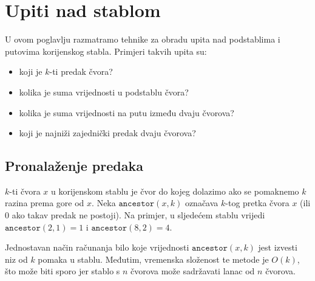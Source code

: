 \chapter{Upiti nad stablom}


U ovom poglavlju razmatramo tehnike za
obradu upita nad
podstablima i putovima korijenskog stabla.
Primjeri takvih upita su:

\begin{itemize}
\item koji je $k$-ti predak čvora?
\item kolika je suma vrijednosti u podstablu čvora?
\item kolika je suma vrijednosti na putu između dvaju čvorova?
\item koji je najniži zajednički predak dvaju čvorova?
\end{itemize}

\section{Pronalaženje predaka}


$k$-ti  čvora $x$ u korijenskom stablu
je čvor do kojeg dolazimo ako se pomaknemo $k$
razina prema gore od $x$.
Neka $\texttt{ancestor}(x,k)$ označava $k$-tog pretka čvora $x$
(ili $0$ ako takav predak ne postoji).
Na primjer, u sljedećem stablu vrijedi
$\texttt{ancestor}(2,1)=1$ i $\texttt{ancestor}(8,2)=4$.
\begin{center}
\end{center}

Jednostavan način računanja bilo koje vrijednosti $\texttt{ancestor}(x,k)$
jest izvesti niz od $k$ pomaka u stablu.
Međutim, vremenska složenost te metode
je $O(k)$, što može biti sporo jer stablo s $n$
čvorova može sadržavati lanac od $n$ čvorova.

